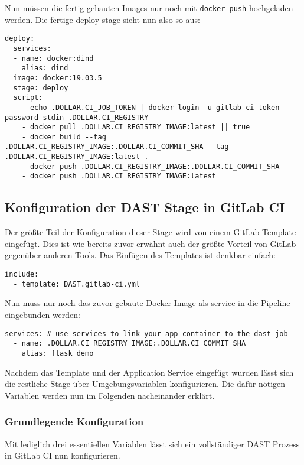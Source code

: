 Nun müssen die fertig gebauten Images nur noch mit \texttt{docker push} hochgeladen werden.
Die fertige deploy stage sieht nun also so aus:

\begin{verbatim}
deploy:
  services:
  - name: docker:dind
    alias: dind
  image: docker:19.03.5
  stage: deploy
  script:
    - echo .DOLLAR.CI_JOB_TOKEN | docker login -u gitlab-ci-token --password-stdin .DOLLAR.CI_REGISTRY
    - docker pull .DOLLAR.CI_REGISTRY_IMAGE:latest || true
    - docker build --tag .DOLLAR.CI_REGISTRY_IMAGE:.DOLLAR.CI_COMMIT_SHA --tag .DOLLAR.CI_REGISTRY_IMAGE:latest .
    - docker push .DOLLAR.CI_REGISTRY_IMAGE:.DOLLAR.CI_COMMIT_SHA
    - docker push .DOLLAR.CI_REGISTRY_IMAGE:latest

\end{verbatim}

\subsection{Konfiguration der DAST Stage in GitLab CI}

Der größte Teil der Konfiguration dieser Stage wird von einem GitLab Template eingefügt.\cite{DynamicApplicationSecurity}
Dies ist wie bereits zuvor erwähnt auch der größte Vorteil von GitLab gegenüber anderen Tools.
Das Einfügen des Templates ist denkbar einfach:
\begin{verbatim}
include:
  - template: DAST.gitlab-ci.yml
\end{verbatim}

Nun muss nur noch das zuvor gebaute Docker Image als service in die Pipeline eingebunden werden:
\begin{verbatim}
services: # use services to link your app container to the dast job
  - name: .DOLLAR.CI_REGISTRY_IMAGE:.DOLLAR.CI_COMMIT_SHA
    alias: flask_demo
\end{verbatim}

Nachdem das Template und der Application Service eingefügt wurden lässt sich die restliche Stage über Umgebungsvariablen konfigurieren.
Die dafür nötigen Variablen werden nun im Folgenden nacheinander erklärt.

\subsubsection{Grundlegende Konfiguration}

Mit lediglich drei essentiellen Variablen lässt sich ein vollständiger DAST Prozess in GitLab CI nun konfigurieren.

